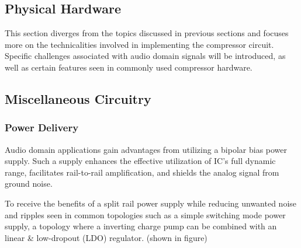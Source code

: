 \documentclass[10pt]{article}
\begin{document}
\begin{multicols*}{2}
        \section{Physical Hardware}
            This section diverges from the topics discussed in previous sections and focuses more on the technicalities involved in implementing the compressor circuit. Specific challenges associated with audio domain signals will be introduced, as well as certain features seen in commonly used compressor hardware.

            \subsection{Miscellaneous Circuitry}

                \subsubsection{Power Delivery}
                    Audio domain applications gain advantages from utilizing a bipolar bias power supply. Such a supply enhances the effective utilization of IC's full dynamic range, facilitates rail-to-rail amplification, and shields the analog signal from ground noise. \cite{ti-3-v-rails}\par
                    To receive the benefits of a split rail power supply while reducing unwanted noise and ripples seen in common topologies such as a simple switching mode power supply, a topology where a inverting charge pump can be combined with an linear \& low-dropout (LDO) regulator. (shown in figure)\par
                    
                    \noindent
                    \begin{minipage}{\linewidth}

                        \centering

\end{minipage}
\end{multicols*}
\end{document}
